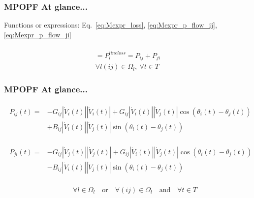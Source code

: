 \documentclass[
	11pt, %
	aspectratio=169, %
]{beamer}
\begin{document}

\begin{frame}
	\frametitle{MPOPF At glance...}

	Functions or expressions: Eq.~\eqref{eq:Mexpr_loss}, \eqref{eq:Mexpr_p_flow_ij}, \eqref{eq:Mexpr_p_flow_ji}

	\begin{gather*}
		[-G_{ij}(\left|\dot{V}_{i}(t) \right|^2 + \left|\dot{V}_{j}(t) \right|^2) + 2G_{ij}\left|\dot{V}_{i}(t) \right|\left|\dot{V}_{j}(t) \right|\cos\left(\theta_{i}(t)-\theta_{j}(t) \right) ] \\
		= P_{l}^{line loss} = P_{ij} + P_{ji} \\[1em]
		\forall l(ij) \in \Omega_{l},\ \forall t \in T
	\end{gather*}

	
\end{frame}


\begin{frame}
	\frametitle{MPOPF At glance...}

	\begin{align*}
		\begin{split}
		P_{ij}(t) = &-G_{ij} \left|\dot{V}_{i}(t) \right| \left|\dot{V}_{i}(t) \right| 
		+ G_{ij} \left|\dot{V}_{i}(t) \right| \left|\dot{V}_{j}(t) \right| \cos\left(\theta_{i}(t)-\theta_{j}(t) \right) \\
		&+ B_{ij} \left|\dot{V}_{i}(t) \right| \left|\dot{V}_{j}(t) \right| \sin\left(\theta_{i}(t)-\theta_{j}(t) \right) 
		\end{split}
	\end{align*}

	\begin{align*}
		\begin{split}
		P_{ji}(t)=&-G_{ij} \left|\dot{V}_{j}(t) \right| \left|\dot{V}_{j}(t) \right| 
		+ G_{ij} \left|\dot{V}_{i}(t) \right| \left|\dot{V}_{j}(t) \right| \cos\left(\theta_{i}(t)-\theta_{j}(t) \right)\\
		&- B_{ij} \left|\dot{V}_{i}(t) \right| \left|\dot{V}_{j}(t) \right| \sin\left(\theta_{i}(t)-\theta_{j}(t) \right)
		\end{split}
	\end{align*}

	\begin{align*}
		\begin{split}
		\quad \quad \forall l \in \Omega_{l} \quad \text{or} \quad \forall (ij) \in \Omega_{l} \quad \text{and} \quad \forall t \in T
		\end{split}
	\end{align*}

	
\end{frame}
\end{document}
